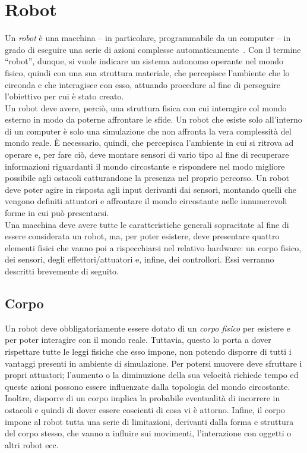 \section{Robot}

Un \textit{robot} è una macchina – in particolare, programmabile da un computer – in grado di eseguire una serie di azioni complesse automaticamente~\cite{18}. Con il termine ``robot'', dunque, si vuole indicare un sistema autonomo operante nel mondo fisico, quindi con una sua struttura materiale, che percepisce l’ambiente che lo circonda e che interagisce con esso, attuando procedure al fine di perseguire l’obiettivo per cui è stato creato.\\
Un robot deve avere, perciò, una struttura fisica con cui interagire col mondo esterno in modo da poterne affrontare le sfide. Un robot che esiste solo all'interno di un computer è solo una simulazione che non affronta la vera complessità del mondo reale. È necessario, quindi, che percepisca l’ambiente in cui si ritrova ad operare e, per fare ciò, deve montare sensori di vario tipo al fine di recuperare informazioni riguardanti il mondo circostante e rispondere nel modo migliore possibile agli ostacoli catturandone la presenza nel proprio percorso. Un robot deve poter agire in risposta agli input derivanti dai sensori, montando quelli che vengono definiti attuatori e affrontare il mondo circostante nelle innumerevoli forme in cui può presentarsi.\\
Una macchina deve avere tutte le caratteristiche generali sopracitate al fine di essere considerata un robot, ma, per poter esistere, deve presentare quattro elementi fisici che vanno poi a rispecchiarsi nel relativo hardware: un corpo fisico, dei sensori, degli effettori/attuatori e, infine, dei controllori. Essi verranno descritti brevemente di seguito.

\subsection{Corpo} 
Un robot deve obbligatoriamente essere dotato di un \textit{corpo fisico} per esistere e per poter interagire con il mondo reale. Tuttavia, questo lo porta a dover rispettare tutte le leggi fisiche che esso impone, non potendo disporre di tutti i vantaggi presenti in ambiente di simulazione. Per potersi muovere deve sfruttare i propri attuatori; l'aumento o la diminuzione della sua velocità richiede tempo ed queste azioni possono essere influenzate dalla topologia del mondo circostante. Inoltre, disporre di un corpo implica la probabile eventualità di incorrere in ostacoli e quindi di dover essere coscienti di cosa vi è attorno. Infine, il corpo impone al robot tutta una serie di limitazioni, derivanti dalla forma e struttura del corpo stesso, che vanno a influire sui movimenti, l’interazione con oggetti o altri robot ecc. 

